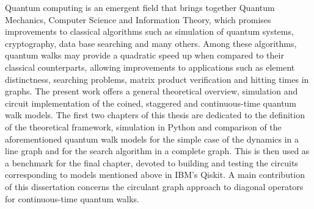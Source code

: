 \documentclass[../../dissertation.tex]{subfiles}
\begin{document}
Quantum computing is an emergent field that brings together Quantum Mechanics,
Computer Science and Information Theory, which promises improvements to
classical algorithms such as simulation of quantum systems, cryptography, data
base searching and many others.  Among these algorithms, quantum walks may provide
a quadratic speed up when compared to their classical  counterparts,  allowing
improvements to applications such as element distinctness, searching problems,
matrix product verification and hitting times in graphs.  The present work
offers a general theoretical overview, simulation and circuit implementation of
the coined, staggered and continuous-time quantum walk models. The first two
chapters of this thesis are dedicated to the definition of the theoretical
framework, simulation in Python and comparison of the aforementioned quantum
walk models for the simple case of the dynamics in a line graph and for the
search algorithm in a complete graph. This is then used as a benchmark
for the final chapter, devoted to building and testing the circuits corresponding to models mentioned above in IBM's Qiskit. A main contribution of this dissertation concerns the circulant graph approach to diagonal operators for continuous-time quantum walks.
\end{document}
